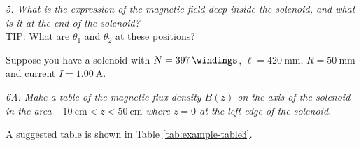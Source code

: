 \documentclass[../Elmag-labhefte-2020.tex]{subfiles}
\begin{document}
\emph{ 5. What is the expression of the magnetic field deep inside the solenoid, and what is it at the end of the solenoid?}
\\
TIP: What are $\theta_1$ and $\theta_2$ at these positions?

Suppose you have a solenoid with $N = \SI{397}{\windings}$, $\ell = \SI{420}{\mm}$, $R = \SI{50}{\mm}$ and current $I = \SI{1.00}{\ampere}$.

\emph{ 6A. Make a table of the magnetic flux density $B(z)$ on the axis of the solenoid in the area $\SI{-10}{\cm} < z < \SI{50}{\cm}$ where $z = 0$ at the left edge of the solenoid.} %


A suggested table is shown in Table \ref{tab:example-table3}.
\end{document}
